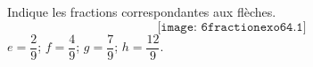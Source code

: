 Indique les fractions correspondantes aux flèches.
\[\texttt{[image: 6fractionexo64.1]}\]
$e=\dfrac29$; $f=\dfrac49$; $g=\dfrac79$; $h=\dfrac{12}9$.